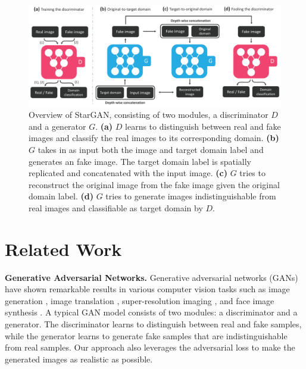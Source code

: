 \documentclass[10pt,twocolumn,letterpaper]{article}
\begin{document}
\begin{figure}[t]
\centering
\centerline{\includegraphics[width=1.0\linewidth]{images/model_overview.pdf}}
\caption{Overview of StarGAN, consisting of two modules, a discriminator $D$ and a generator $G$. \textbf{(a)} $D$ learns to distinguish between real and fake images and classify the real images to its corresponding domain. \textbf{(b)} $G$ takes in as input both the image and target domain label and generates an fake image. The target domain label is spatially replicated and concatenated with the input image. \textbf{(c)} $G$ tries to reconstruct the original image from the fake image given the original domain label. \textbf{(d)} $G$ tries to generate images indistinguishable from real images and classifiable as target domain by $D$.}
\label{model}
\end{figure}

\vspace{-5px}
\section{Related Work} \label{related work}

\noindent\textbf{Generative Adversarial Networks.} Generative adversarial networks (GANs) \cite{goodfellow2014generative} have shown remarkable results in various computer vision tasks such as image generation \cite{Huang_2017_CVPR,radford2015unsupervised,zhao2016energy,karras2017progressive}, image translation \cite{Isola_2017_CVPR,kim2017learning,zhu2017unpaired}, super-resolution imaging \cite{Ledig_2017_CVPR}, and face image synthesis \cite{kim2017unsupervised,li2016deep,Shen_2017_CVPR,Zhang_2017_CVPR}. A typical GAN model consists of two modules: a discriminator and a generator. The discriminator learns to distinguish between real and fake samples, while the generator learns to generate fake samples that are indistinguishable from real samples. Our approach also leverages the adversarial loss to make the generated images as realistic as possible.
\end{document}
